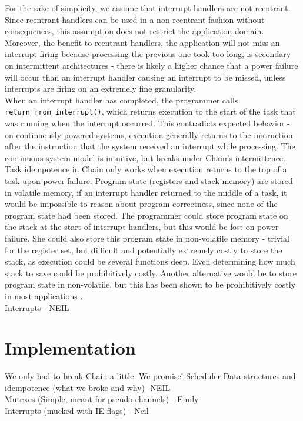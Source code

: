 \documentclass[11pt]{sensys-proc}
\newcommand{\chain}{Chain\xspace}
\begin{document}
For the sake of simplicity, we assume that interrupt handlers are not
reentrant. Since reentrant handlers can be used in a non-reentrant fashion
without consequences, this assumption does not restrict the application domain.
Moreover, the benefit to reentrant handlers, the application will not miss an
interrupt firing because processing the previous one took too long, is
secondary on intermittent architectures - there is likely a higher chance that
a power failure will occur than an interrupt handler causing an interrupt to be
missed, unless interrupts are firing on an extremely fine granularity.\\

When an interrupt handler has completed, the programmer calls
\texttt{return\_from\_interrupt()}, which returns execution to the start
of the task that was running when the interrupt occurred. This contradicts
expected behavior - on continuously powered systems, execution generally
returns to the instruction after the instruction that the system received an
interrupt while processing. The continuous system model is intuitive, but
breaks under \chain's intermittence. Task idempotence in \chain only works
when execution returns to the top of a
task upon power failure. Program state (registers and stack memory) are stored
in volatile memory, if an interrupt handler returned to the middle of a task,
it would be impossible to reason about program correctness, since none of the
program state had been stored. The programmer could store program state on the
stack at the start of interrupt handlers, but this would be lost on power
failure. She could also store this program state in non-volatile memory -
trivial for the register set, but difficult and potentially extremely costly to
store the stack, as execution could be several functions deep. Even determining
how much stack to save could be prohibitively costly. Another alternative would
be to store program state in non-volatile, but this has been shown to be
prohibitively costly in most applications \cite{Aware}. \\

Interrupts - NEIL\\


\section{Implementation}
We only had to break \chain a little. We promise!
Scheduler Data structures and idempotence (what we broke and why) -NEIL\\
Mutexes (Simple, meant for pseudo channels) - Emily\\
Interrupts (mucked with IE flags) - Neil\\
\end{document}
